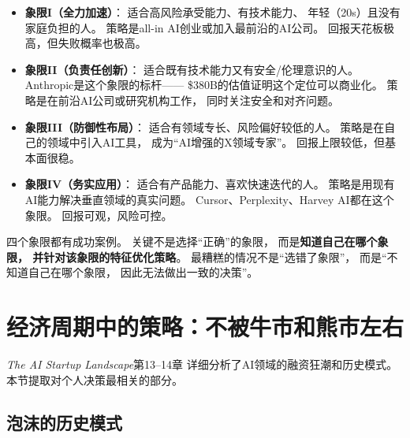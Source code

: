 \begin{itemize}
  \item \textbf{象限I（全力加速）}：
    适合高风险承受能力、有技术能力、
    年轻（20s）且没有家庭负担的人。
    策略是all-in AI创业或加入最前沿的AI公司。
    回报天花板极高，但失败概率也极高。

  \item \textbf{象限II（负责任创新）}：
    适合既有技术能力又有安全/伦理意识的人。
    Anthropic是这个象限的标杆——
    \$380B的估值证明这个定位可以商业化。
    策略是在前沿AI公司或研究机构工作，
    同时关注安全和对齐问题。

  \item \textbf{象限III（防御性布局）}：
    适合有领域专长、风险偏好较低的人。
    策略是在自己的领域中引入AI工具，
    成为``AI增强的X领域专家''。
    回报上限较低，但基本面很稳。

  \item \textbf{象限IV（务实应用）}：
    适合有产品能力、喜欢快速迭代的人。
    策略是用现有AI能力解决垂直领域的真实问题。
    Cursor、Perplexity、Harvey AI都在这个象限。
    回报可观，风险可控。
\end{itemize}

\begin{corebox}[没有``正确''的象限]
四个象限都有成功案例。
关键不是选择``正确''的象限，
而是\textbf{知道自己在哪个象限，
并针对该象限的特征优化策略}。
最糟糕的情况不是``选错了象限''，
而是``不知道自己在哪个象限，
因此无法做出一致的决策''。
\end{corebox}


\section{经济周期中的策略：不被牛市和熊市左右}
\label{sec:fg-cycles}

\textit{The AI Startup Landscape}第13--14章
详细分析了AI领域的融资狂潮和历史模式。
本节提取对个人决策最相关的部分。

\subsection{泡沫的历史模式}


